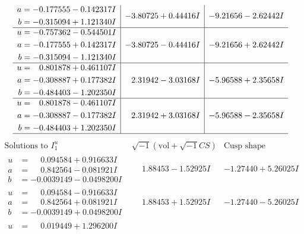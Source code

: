 \documentclass[1p]{elsarticle_modified}
\theoremstyle{definition}
\newcommand{\I}{\sqrt{-1}}
\begin{document}
$$\begin{array}{c|c|c}
\begin{aligned}
a &= -0.177555 - 0.142317 I \\
b &= -0.315094 + 1.121340 I\end{aligned}
 & -3.80725 + 0.44416 I & -9.21656 - 2.62442 I \\ \hline\begin{aligned}
u &= -0.757362 - 0.544501 I \\
a &= -0.177555 + 0.142317 I \\
b &= -0.315094 - 1.121340 I\end{aligned}
 & -3.80725 - 0.44416 I & -9.21656 + 2.62442 I \\ \hline\begin{aligned}
u &= \phantom{-}0.801878 + 0.461107 I \\
a &= -0.308887 + 0.177382 I \\
b &= -0.484403 - 1.202350 I\end{aligned}
 & \phantom{-}2.31942 - 3.03168 I & -5.96588 + 2.35658 I \\ \hline\begin{aligned}
u &= \phantom{-}0.801878 - 0.461107 I \\
a &= -0.308887 - 0.177382 I \\
b &= -0.484403 + 1.202350 I\end{aligned}
 & \phantom{-}2.31942 + 3.03168 I & -5.96588 - 2.35658 I\\
 \hline 
 \end{array}$$\newpage$$\begin{array}{c|c|c}  
\text{Solutions to }I^u_{1}& \I (\text{vol} + \sqrt{-1}CS) & \text{Cusp shape}\\
 \hline 
\begin{aligned}
u &= \phantom{-}0.094584 + 0.916633 I \\
a &= \phantom{-}0.842564 - 0.081921 I \\
b &= -0.0039149 - 0.0498200 I\end{aligned}
 & \phantom{-}1.88453 - 1.52925 I & -1.27440 + 5.26025 I \\ \hline\begin{aligned}
u &= \phantom{-}0.094584 - 0.916633 I \\
a &= \phantom{-}0.842564 + 0.081921 I \\
b &= -0.0039149 + 0.0498200 I\end{aligned}
 & \phantom{-}1.88453 + 1.52925 I & -1.27440 - 5.26025 I \\ \hline\begin{aligned}
u &= \phantom{-}0.019449 + 1.296200 I \\

\end{aligned}
\end{array}$$
\end{document}
